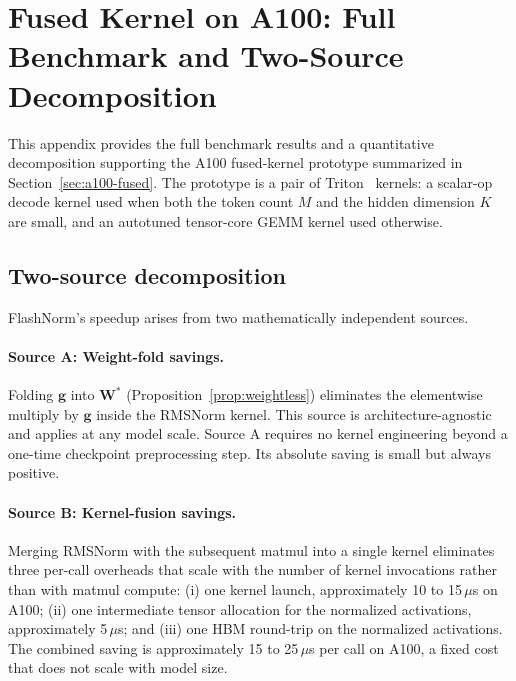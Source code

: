 \documentclass{article}
\begin{document}
\section{Fused Kernel on A100: Full Benchmark and Two-Source Decomposition}\label{app:a100}

This appendix provides the full benchmark results and a quantitative decomposition supporting the A100 fused-kernel prototype summarized in Section~\ref{sec:a100-fused}. The prototype is a pair of Triton~\citep{triton} kernels: a scalar-op decode kernel used when both the token count $M$ and the hidden dimension $K$ are small, and an autotuned tensor-core GEMM kernel used otherwise.

\subsection{Two-source decomposition}

FlashNorm's speedup arises from two mathematically independent sources.

\paragraph{Source A: Weight-fold savings.} Folding $\mathbf{g}$ into $\mathbf{W}^\ast$ (Proposition~\ref{prop:weightless}) eliminates the elementwise multiply by $\mathbf{g}$ inside the RMSNorm kernel. This source is architecture-agnostic and applies at any model scale. Source A requires no kernel engineering beyond a one-time checkpoint preprocessing step. Its absolute saving is small but always positive.

\paragraph{Source B: Kernel-fusion savings.} Merging RMSNorm with the subsequent matmul into a single kernel eliminates three per-call overheads that scale with the number of kernel invocations rather than with matmul compute: (i) one kernel launch, approximately 10 to 15\,$\mu$s on A100; (ii) one intermediate tensor allocation for the normalized activations, approximately 5\,$\mu$s; and (iii) one HBM round-trip on the normalized activations. The combined saving is approximately 15 to 25\,$\mu$s per call on A100, a fixed cost that does not scale with model size.
\end{document}
